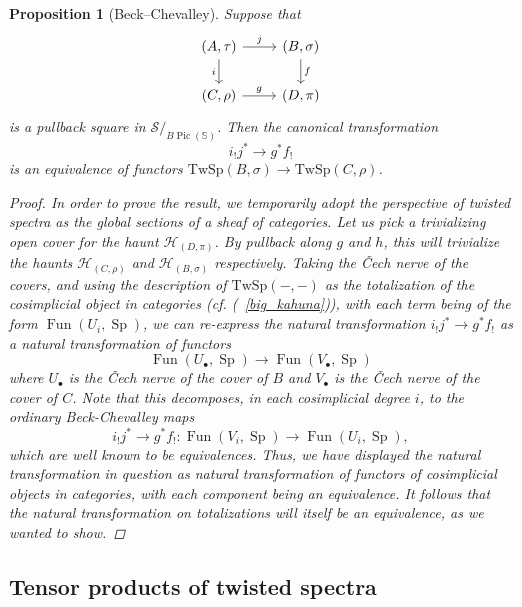 \documentclass[10pt]{amsart}
\newcommand{\longto}{\longrightarrow}
\theoremstyle{plain}
\newtheorem{proposition}[theorem]{Proposition}
\theoremstyle{definition}
\DeclareMathOperator{\Sp}{Sp}
\DeclareMathOperator{\Fun}{Fun}
\DeclareMathOperator{\Pic}{Pic}
\newcommand{\bS}{\mathbb{S}}
\newcommand{\cH}{\mathcal{H}}
\newcommand{\TwSp}{\mathrm{TwSp}}
\newcommand{\cS}{\mathcal{S}}
\begin{document}
\begin{proposition}[Beck--Chevalley] \label{prop:Beck_Chevalley_preliminary}
  Suppose that
  \[
  \begin{tikzcd}
    (A,\tau) \arrow[r,"j"] \arrow[d,"i"'] & (B,\sigma) \arrow[d,"f"] \\ (C,\rho) \arrow[r,"g"] & (D,\pi)
  \end{tikzcd}
  \]
  is a pullback square in $\cS/_{B\Pic(\bS)}$. Then the canonical transformation
  \[
  i_! j^* \longto g^* f_!
  \]
  is an equivalence of functors $\TwSp(B,\sigma) \to \TwSp(C,\rho)$.
  \begin{proof}
    In order to prove the result, we temporarily adopt the perspective of twisted spectra as the global sections of a sheaf of categories.
    Let us pick a trivializing open cover for the haunt $\cH_{(D, \pi)}$.
    By pullback along $g$ and $h$, this will trivialize the haunts $\cH_{(C, \rho)}$ and $\cH_{(B, \sigma)}$ respectively.
    Taking the {\v C}ech nerve of the covers, and using the description  of $\TwSp(-,-)$ as the totalization of the cosimplicial object in categories (cf. (~\ref{big_kahuna})), with each term being of the form $\Fun(U_i, \Sp)$, we can re-express the  natural transformation $i_! j^* \to g^* f_!$ as a natural transformation of functors
 $$
 \Fun( U_\bullet ,\Sp) \to \Fun(V_\bullet, \Sp)
 $$
 where $U_\bullet$ is the {\v C}ech nerve of the cover of $B$ and $V_\bullet$ is the {\v C}ech nerve of the cover of $C$.
 Note that this decomposes, in each cosimplicial degree $i$, to the ordinary Beck-Chevalley maps
$$
i_!j^* \to g^* f_!: \Fun(V_i, \Sp) \to \Fun(U_i, \Sp),
$$
which are well known to be equivalences.
Thus, we have displayed the natural transformation in question as  natural transformation of functors of cosimplicial objects in categories, with each component being an equivalence.
It follows that the natural transformation on totalizations will itself be an equivalence, as we wanted to show.
  \end{proof}
\end{proposition}


\subsection{Tensor products of twisted spectra} \label{sec:tensor_prod_TwSp}
\end{document}
